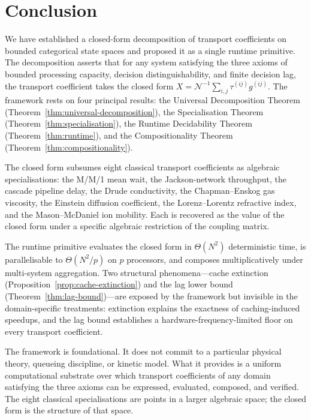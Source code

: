 \documentclass[twocolumn,11pt,a4paper]{article}
\newcommand{\TP}{X}
\newcommand{\Norm}{\mathcal{N}}
\newcommand{\lag}{\tau}
\newcommand{\cpl}{g}
\newcommand{\classcount}{N}
\begin{document}
\section{Conclusion}
\label{sec:conclusion}

We have established a closed-form decomposition of transport coefficients on bounded categorical state spaces and proposed it as a single runtime primitive. The decomposition asserts that for any system satisfying the three axioms of bounded processing capacity, decision distinguishability, and finite decision lag, the transport coefficient takes the closed form $\TP = \Norm^{-1} \sum_{i,j} \lag^{(ij)} \cpl^{(ij)}$. The framework rests on four principal results: the Universal Decomposition Theorem (Theorem~\ref{thm:universal-decomposition}), the Specialisation Theorem (Theorem~\ref{thm:specialisation}), the Runtime Decidability Theorem (Theorem~\ref{thm:runtime}), and the Compositionality Theorem (Theorem~\ref{thm:compositionality}).

The closed form subsumes eight classical transport coefficients as algebraic specialisations: the M/M/1 mean wait, the Jackson-network throughput, the cascade pipeline delay, the Drude conductivity, the Chapman--Enskog gas viscosity, the Einstein diffusion coefficient, the Lorenz--Lorentz refractive index, and the Mason--McDaniel ion mobility. Each is recovered as the value of the closed form under a specific algebraic restriction of the coupling matrix.

The runtime primitive evaluates the closed form in $\Theta(\classcount^2)$ deterministic time, is parallelisable to $\Theta(\classcount^2/p)$ on $p$ processors, and composes multiplicatively under multi-system aggregation. Two structural phenomena---cache extinction (Proposition~\ref{prop:cache-extinction}) and the lag lower bound (Theorem~\ref{thm:lag-bound})---are exposed by the framework but invisible in the domain-specific treatments: extinction explains the exactness of caching-induced speedups, and the lag bound establishes a hardware-frequency-limited floor on every transport coefficient.

The framework is foundational. It does not commit to a particular physical theory, queueing discipline, or kinetic model. What it provides is a uniform computational substrate over which transport coefficients of any domain satisfying the three axioms can be expressed, evaluated, composed, and verified. The eight classical specialisations are points in a larger algebraic space; the closed form is the structure of that space.



\end{document}
